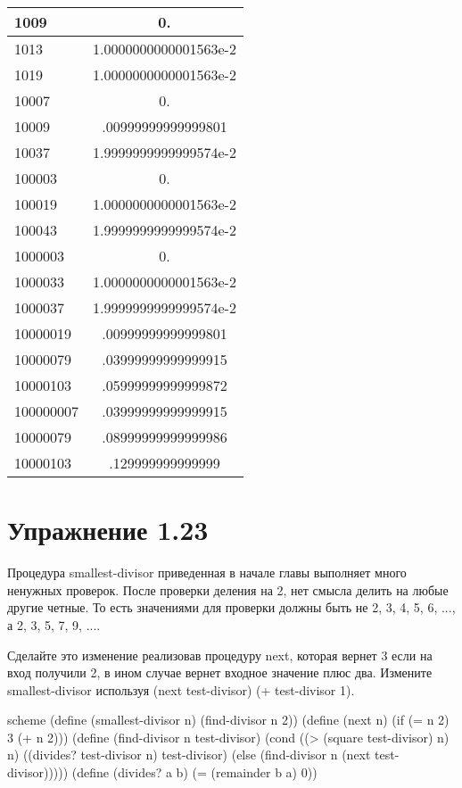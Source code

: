 \begin{center}
  \begin{tabular}{ | l | c | }
    \hline
    1009 & 0. \\ \hline
    1013 & 1.0000000000001563e-2 \\ \hline
    1019 & 1.0000000000001563e-2 \\ \hline
    10007 & 0. \\ \hline
    10009 & .00999999999999801 \\ \hline
    10037 & 1.9999999999999574e-2 \\ \hline
    100003 & 0. \\ \hline
    100019 & 1.0000000000001563e-2 \\ \hline
    100043 & 1.9999999999999574e-2 \\ \hline
    1000003 & 0. \\ \hline
    1000033 & 1.0000000000001563e-2 \\ \hline
    1000037 & 1.9999999999999574e-2 \\ \hline
    10000019 & .00999999999999801 \\ \hline
    10000079 & .03999999999999915 \\ \hline
    10000103 & .05999999999999872 \\ \hline
    100000007 & .03999999999999915 \\ \hline
    10000079 & .08999999999999986 \\ \hline
    10000103 & .129999999999999 \\ \hline
  \end{tabular}
\end{center}

\chapter{Упражнение 1.23}

Процедура smallest-divisor приведенная в начале главы выполняет много ненужных проверок. После проверки деления на 2, нет смысла делить на любые другие четные. То есть значениями для проверки должны быть не 2, 3, 4, 5, 6, ..., а 2, 3, 5, 7, 9, ....

Сделайте это изменение реализовав процедуру next, которая вернет 3 если на вход получили 2, в ином случае вернет входное значение плюс два. Измените smallest-divisor используя (next test-divisor) (+ test-divisor 1).

\begin{codelisting}{scheme}
(define (smallest-divisor n)
  (find-divisor n 2))
(define (next n)
  (if (= n 2)
      3
      (+ n 2)))
(define (find-divisor n test-divisor)
  (cond ((> (square test-divisor) n) n)
        ((divides? test-divisor n) test-divisor)
        (else (find-divisor n (next test-divisor)))))
(define (divides? a b)
  (= (remainder b a) 0))
\end{codelisting}

